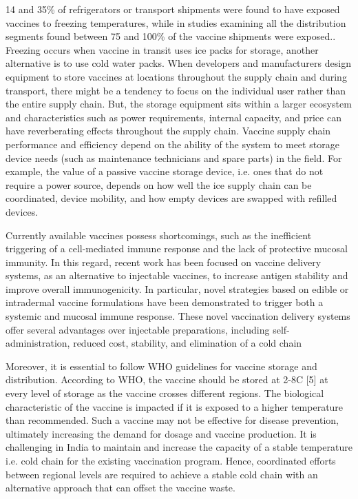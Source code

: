 \documentclass{article}
\begin{document}
14 and 35\% of refrigerators or transport shipments were found to have exposed vaccines to freezing temperatures, while in studies examining all the distribution segments found between 75 and 100\% of the vaccine shipments were exposed.\cite{kartoglu2014tools}. Freezing occurs when vaccine in transit uses ice packs for storage, another alternative is to use cold water packs. When developers and manufacturers design equipment to store vaccines at locations throughout the supply chain and during transport, there might be a tendency to focus on the individual user rather than the entire supply chain. But, the storage equipment sits within a larger ecosystem and characteristics such as power requirements, internal capacity, and price can have reverberating effects throughout the supply chain. Vaccine supply chain performance and efficiency depend on the ability of the system to meet storage device needs (such as maintenance technicians and spare parts) in the field. For example, the value of a passive vaccine storage device, i.e. ones that do not require a power source, depends on how well the ice supply chain can be coordinated, device mobility, and how empty devices are swapped with refilled devices.\cite{lee2017importance}
 
Currently available vaccines possess shortcomings, such as the inefficient triggering of a cell-mediated immune response and the lack of protective mucosal immunity. In this regard, recent work has been focused on vaccine delivery systems, as an alternative to injectable vaccines, to increase antigen stability and improve overall immunogenicity. In particular, novel strategies based on edible or intradermal vaccine formulations have been demonstrated to trigger both a systemic and mucosal immune response. These novel vaccination delivery systems offer several advantages over injectable preparations, including self-administration, reduced cost, stability, and elimination of a cold chain \cite{criscuolo2019alternative}

Moreover, it is essential to follow WHO guidelines for vaccine storage and distribution. According to WHO, the vaccine should be stored at 2-8\degree C [5] at every level of storage as the vaccine crosses different regions. The biological characteristic of the vaccine is impacted if it is exposed to a higher temperature than recommended. Such a vaccine may not be effective for disease prevention, ultimately increasing the demand for dosage and vaccine production. It is challenging in India to maintain and increase the capacity of a stable temperature i.e. cold chain for the existing vaccination program. Hence, coordinated efforts between regional levels are required to achieve a stable cold chain with an alternative approach that can offset the vaccine waste. 
 
\end{document}
